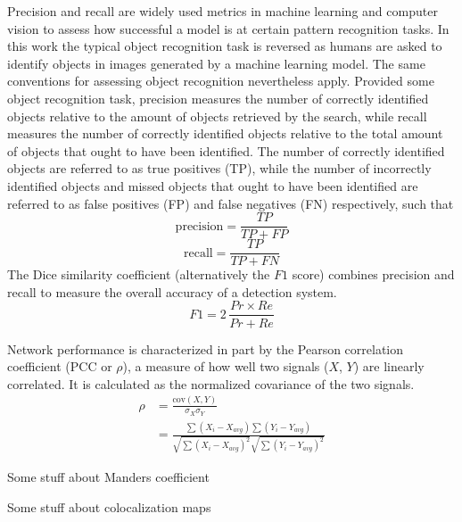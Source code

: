 Precision and recall are widely used metrics in machine learning and computer vision to assess how successful a model is at certain pattern recognition tasks. In this work the typical object recognition task is reversed as humans are asked to identify objects in images generated by a machine learning model. The same conventions for assessing object recognition nevertheless apply. Provided some object recognition task, precision measures the number of correctly identified objects relative to the amount of objects retrieved by the search, while recall measures the number of correctly identified objects relative to the total amount of objects that ought to have been identified. The number of correctly identified objects are referred to as true positives (TP),
while the number of incorrectly identified objects and missed objects that ought to have been identified are referred to as false positives (FP) and false negatives (FN) respectively, such that
\begin{equation}
    \text{precision} = \frac{TP}{TP+FP}
\end{equation}
%
\begin{equation}
    \text{recall} = \frac{TP}{TP+FN}
\end{equation}
%
The Dice similarity coefficient (alternatively the $F1$ score) combines precision and recall to measure the overall accuracy of a detection system.
\begin{equation}
    F1 = 2\, \frac{Pr \times Re}{Pr+Re}
\end{equation}


Network performance is characterized in part by the Pearson correlation coefficient (PCC or $\rho$), a measure of how well two signals ($X$, $Y$) are linearly correlated. It is calculated as the normalized covariance of the two signals.
%
\begin{align}
    \rho &= \frac{\text{cov}(X, Y)}{\sigma_X \sigma_Y} \\
    &= \frac{\sum\left(X_i - X_{avg}\right)
             \sum\left(Y_i - Y_{avg}\right)}
            {\sqrt{\sum\left(X_i - X_{avg}\right)^2}
             \sqrt{\sum\left(Y_i - Y_{avg}\right)^2}}
\end{align}
%

Some stuff about Manders coefficient


Some stuff about colocalization maps



